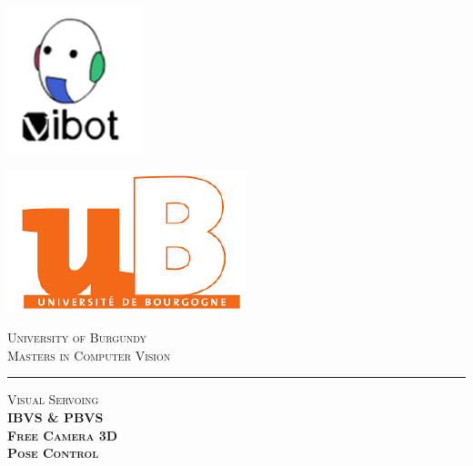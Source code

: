\documentclass[a4paper,12pt]{article}
\newcommand{\HRule}{\rule{\linewidth}{0.5mm}}
\begin{document}
\begin{minipage}{0.50\textwidth} 
	\begin{flushleft}
	\includegraphics[scale = 0.50]{Logo-vibot.png}
	\end{flushleft}
\end{minipage}
\begin{minipage}{0.50\textwidth} 
	\begin{flushright}
		\includegraphics[scale = 0.50]{Logo-ub.png}
	\end{flushright}
\end{minipage}

\begin{center} 
	\vspace*{-1cm}
	\textsc{\Large University of Burgundy}\\[0.5cm]

	\textsc{\Large Masters in Computer Vision}
\end{center}
\vspace*{-0.5cm}
\HRule
\vspace*{4cm}


\begin{minipage}{0.9\textwidth} 
	\begin{center}																					%
		\textsc{\LARGE Visual Servoing} \\[0.5cm]
		\textsc{\LARGE \textbf{IBVS \& PBVS \\[0.2cm] Free Camera 3D \\[0.2cm] Pose Control}} \\
		
	\end{center}
\end{minipage}\\[1.5cm]
\end{document}
